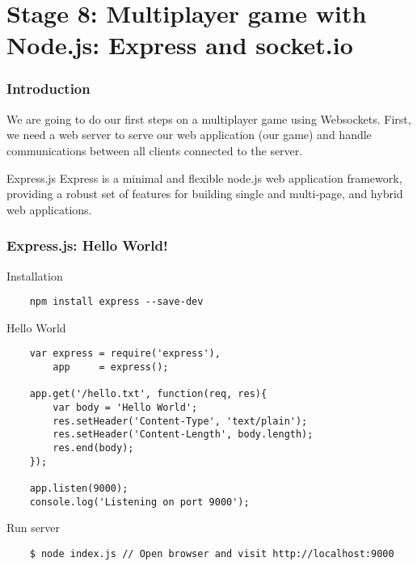 \section{Stage 8: Multiplayer game with Node.js: Express and socket.io}

\begin{frame}[fragile]
  \begin{center}
  \end{center}
\end{frame}

\begin{frame}[fragile]
  \frametitle{Introduction}

  We are going to do our first steps on a multiplayer game using Websockets. First, we need a web server to serve our web application (our game) and handle communications between all clients connected to the server.

  \pause

  \begin{block}{Express.js}
    Express is a minimal and flexible node.js web application framework, providing a robust set of features for building single and multi-page, and hybrid web applications.
  \end{block}
\end{frame}
    
\begin{frame}[fragile]
  \frametitle{Express.js: Hello World!}

  \begin{block}{Installation}
    {\tiny
    \begin{verbatim}
    npm install express --save-dev
    \end{verbatim}
    }
  \end{block}

  \pause

  \begin{block}{Hello World}
    {\tiny
    \begin{verbatim}
    var express = require('express'),
        app     = express();

    app.get('/hello.txt', function(req, res){
        var body = 'Hello World';
        res.setHeader('Content-Type', 'text/plain');
        res.setHeader('Content-Length', body.length);
        res.end(body);
    });

    app.listen(9000);
    console.log('Listening on port 9000');
    \end{verbatim}
    }
  \end{block}

  \pause

  \begin{block}{Run server}
    {\tiny
    \begin{verbatim}
    $ node index.js // Open browser and visit http://localhost:9000
    \end{verbatim}
    }
  \end{block}
\end{frame}


